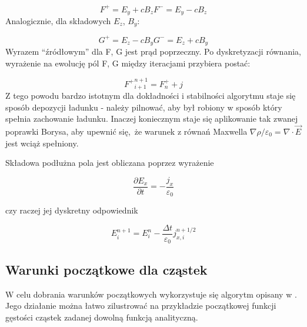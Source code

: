 
    \begin{equation}
        F^{+} = E_y + c B_z
        F^{-} = E_y - c B_z
        \label{eqn:Birdsall-electromagnetic-quantities}
    \end{equation}
    Analogicznie, dla składowych $E_z$, $B_y$:

    \begin{equation}
        G^{+} = E_z - c B_y
        G^{-} = E_z + c B_y
        \label{eqn:Birdsall-electromagnetic-quantities-alternate-axes}
    \end{equation}
    Wyrazem ``źródłowym'' dla F, G jest prąd poprzeczny. Po dyskretyzacji
    równania, wyrażenie na ewolucję pól F, G między iteracjami przybiera
    postać:

    \begin{equation}
        {F^{+}}^{n+1}_{i+1} = F^{+}_{n} + j
    \end{equation}
    Z tego powodu bardzo istotnym dla dokładności i stabilności algorytmu staje
    się sposób depozycji ładunku - należy pilnować, aby był robiony w sposób
    który spełnia zachowanie ładunku. Inaczej koniecznym staje się aplikowanie
    tak zwanej poprawki Borysa, 
    aby upewnić się, że warunek z równań Maxwella $\nabla \rho / \varepsilon_0
    = \nabla \cdot \vec{E}$ jest wciąż spełniony.

    Składowa podłużna pola jest obliczana poprzez wyrażenie

    \begin{equation}
    \frac{\partial E_x}{\partial t} = - \frac{j_x}{\varepsilon_0}
    \label{longitudinal-field-differential}
    \end{equation}

    czy raczej jej dyskretny odpowiednik

    \begin{equation}
        E_i^{n+1} = E_i^n - \frac{\Delta t}{\varepsilon_0} j_{x,i}^{n+1/2}
    \label{longitudinal-field-finite-differential}
    \end{equation}


    \subsection{Warunki początkowe dla cząstek}

    W celu dobrania warunków początkowych wykorzystuje się algorytm opisany w
    . Jego działanie można łatwo zilustrować na
    przykładzie początkowej funkcji gęstości cząstek zadanej dowolną funkcją
    analityczną. 

